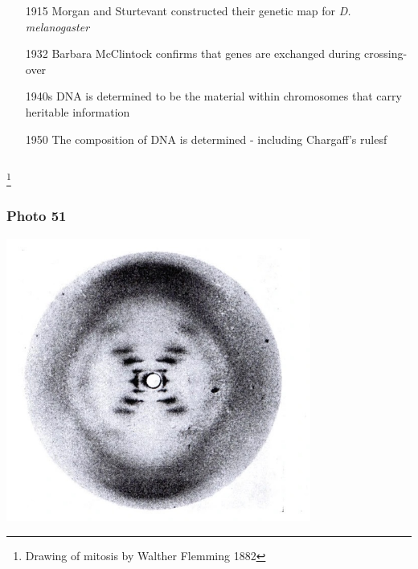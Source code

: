 \documentclass{beamer}
\newcommand\blfootnote[1]{%
	\begingroup
	\renewcommand\thefootnote{}\footnote{#1}%
	\addtocounter{footnote}{-1}%
	\endgroup
}
\begin{document}
\begin{frame}
\begin{columns}
\begin{column}{0.6\textwidth}
					\begin{itemize}
						\small
						\item[1915] Morgan and Sturtevant constructed their genetic map for \textit{D. melanogaster}
						\item[1932] Barbara McClintock confirms that genes are exchanged during crossing-over
						\item[1940s] DNA is determined to be the material within chromosomes that carry heritable information
						\item[1950] The composition of DNA is determined - including Chargaff's rulesf
						
	
						
					\end{itemize}
				\end{column}
				
			\end{columns}
			\blfootnote{Drawing of mitosis by Walther Flemming 1882}
			
			
		\end{frame}
		
		
		
		
		
		\begin{frame}
				\frametitle{Photo 51}
				\centering
			\includegraphics[keepaspectratio, width  =0.75\textwidth]{img/photo_51} 
		\end{frame}
		
\end{document}
